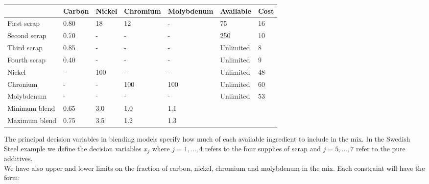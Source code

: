 \documentclass[a4paper,10 pt,titlepage,twoside]{book}
\theoremstyle{plain}
\theoremstyle{definition}
\theoremstyle{remark}
\begin{document}
\begin{table}[]
	\begin{tabular}{@{}lllllll@{}}
		\toprule
		& Carbon & Nickel & Chromium & Molybdenum & Available & Cost \\ \midrule
		First scrap   & 0.80   & 18     & 12       & -          & 75        & 16   \\
		Second scrap  & 0.70   & -      & -        & -          & 250       & 10   \\
		Third scrap   & 0.85   & -      & -        & -          & Unlimited & 8    \\
		Fourth scrap  & 0.40   & -      & -        & -          & Unlimited & 9    \\
		Nickel        & -      & 100    & -        & -          & Unlimited & 48   \\
		Chronium      & -      & -      & 100      & 100        & Unlimited & 60   \\
		Molybdenum    & -      & -      & -        & -          & Unlimited & 53   \\ \midrule
		Minimum blend & 0.65   & 3.0    & 1.0      & 1.1        &           &      \\ 
		Maximum blend & 0.75   & 3.5    & 1.2      & 1.3        &           &      \\ \midrule
	\end{tabular}
\end{table}


The principal decision variables in blending models specify how much of each available ingredient to include in the mix. In the Swedish Steel example we define the decision variables $x_{j}$ where $j = 1, \dots, 4$ refers to the four supplies of scrap and $j = 5, \dots, 7$ refer to the pure additives.\\
We have also upper and lower limits on the fraction of carbon, nickel, chromium and molybdenum in the mix. Each constraint will have the form:\\
\end{document}
